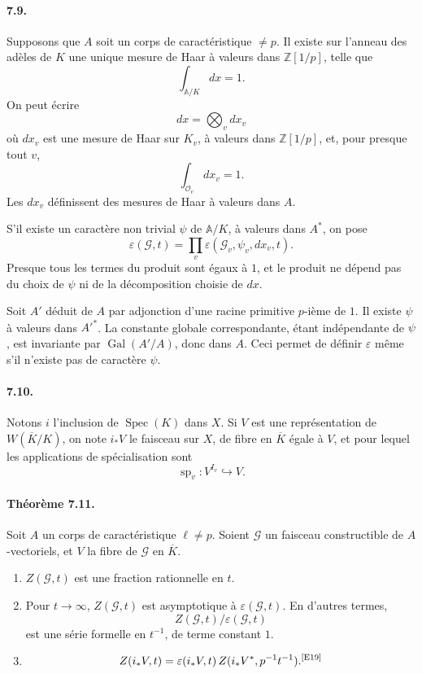 \documentclass[10pt,letterpaper]{article}
\newcommand{\Gal}{\operatorname{Gal}}
\newcommand{\Spec}{\operatorname{Spec}}
\providecommand{\spc}{\operatorname{sp}}
\providecommand{\Spec}{\operatorname{Spec}}
\providecommand{\Gal}{\operatorname{Gal}}
\providecommand{\spc}{\operatorname{sp}}
\providecommand{\Gal}{\operatorname{Gal}}
\providecommand{\Spec}{\operatorname{Spec}}
\providecommand{\Spec}{\operatorname{Spec}}
\providecommand{\Gal}{\operatorname{Gal}}
\providecommand{\spc}{\operatorname{sp}}
\providecommand{\Gal}{\operatorname{Gal}}
\newcommand{\auditmark}[1]{\textsuperscript{\normalfont\scriptsize[E#1]}}
\begin{document}
\paragraph{7.9.} Supposons que \(A\) soit un corps de caractéristique \(\ne p\). Il existe sur l'anneau des adèles de \(K\) une unique mesure de Haar à valeurs dans \(\mathbb Z[1/p]\), telle que
\[
\int_{\mathbb A/K}dx=1.
\]
On peut écrire
\[
dx=\bigotimes_v dx_v
\]
où \(dx_v\) est une mesure de Haar sur \(K_v\), à valeurs dans \(\mathbb Z[1/p]\), et, pour presque tout \(v\),
\[
\int_{\mathcal O_v}dx_v=1.
\]
Les \(dx_v\) définissent des mesures de Haar à valeurs dans \(A\).

S'il existe un caractère non trivial \(\psi\) de \(\mathbb A/K\), à valeurs dans \(A^*\), on pose
\[
\tag{7.9.1}
\varepsilon(\mathcal G,t)=\prod_v
\varepsilon(\mathcal G_v,\psi_v,dx_v,t).
\]
Presque tous les termes du produit sont égaux à \(1\), et le produit ne dépend pas du choix de \(\psi\) ni de la décomposition choisie de \(dx\).

Soit \(A'\) déduit de \(A\) par adjonction d'une racine primitive \(p\)-ième de \(1\). Il existe \(\psi\) à valeurs dans \(A'^*\). La constante globale correspondante, étant indépendante de \(\psi\), est invariante par \(\Gal(A'/A)\), donc dans \(A\). Ceci permet de définir \(\varepsilon\) même s'il n'existe pas de caractère \(\psi\).

\paragraph{7.10.} Notons \(i\) l'inclusion de \(\Spec(K)\) dans \(X\). Si \(V\) est une représentation de \(W(\overline K/K)\), on note \(i_*V\) le faisceau sur \(X\), de fibre en \(\overline K\) égale à \(V\), et pour lequel les applications de spécialisation sont
\[
\spc_v:V^{I_v}\hookrightarrow V.
\]

\paragraph{Théorème 7.11.} Soit \(A\) un corps de caractéristique \(\ell\ne p\). Soient \(\mathcal G\) un faisceau constructible de \(A\)-vectoriels, et \(V\) la fibre de \(\mathcal G\) en \(\overline K\).
\begin{enumerate}[label=(\roman*)]
\item \(Z(\mathcal G,t)\) est une fraction rationnelle en \(t\).
\item Pour \(t\to\infty\), \(Z(\mathcal G,t)\) est asymptotique à \(\varepsilon(\mathcal G,t)\). En d'autres termes,
\[
Z(\mathcal G,t)/\varepsilon(\mathcal G,t)
\]
est une série formelle en \(t^{-1}\), de terme constant \(1\).
\item
\[
Z(i_*V,t)=\varepsilon(i_*V,t)\,Z(i_*V^*,p^{-1}t^{-1}).\auditmark{19}
\]
\end{enumerate}
\end{document}
